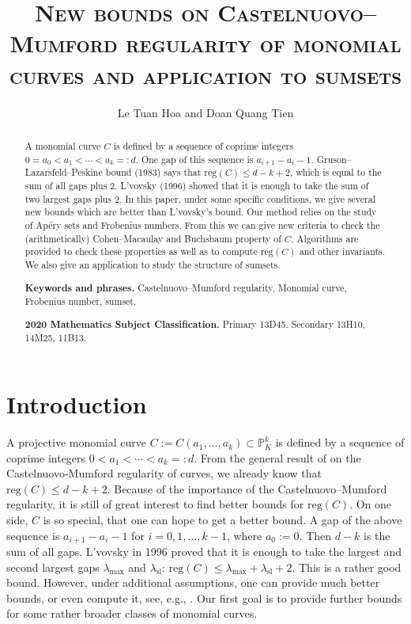 \documentclass[11pt]{article}
\date{}
\newcommand{\keywords}[1]{\par\smallskip\noindent\textbf{Keywords and phrases. }#1\par\smallskip}
\newcommand{\subjclass}[1]{\par\smallskip\noindent\textbf{2020 Mathematics Subject Classification. }#1\par\smallskip}
\def\reg{\mathrm{reg}}
\def\Pset{{\mathbb P}}
\theoremstyle{remark}
\theoremstyle{definition}
\begin{document}
\title{\textsc{New bounds on Castelnuovo--Mumford regularity of monomial curves and application to sumsets}}
\author{Le Tuan Hoa and Doan Quang Tien}

\maketitle
\begin{abstract}  
A monomial curve $C$ is defined by a sequence of coprime integers $0 = a_0 < a_1 < \cdots < a_k =: d$. One gap of this sequence is $a_{i+1} - a_i  - 1$. Gruson--Lazarsfeld--Peskine bound (1983) says that $\reg(C) \le d  -  k +2$, which is equal to the sum of all gaps plus 2. L'vovsky (1996) showed that it is enough  to take the sum of two largest gaps plus 2. In this paper, under some specific conditions, we give several new bounds which are better than L'vovsky’s bound.  Our method relies on the study of Ap\'ery sets  and Frobenius numbers. From this we can give new criteria to check the (arithmetically) Cohen--Macaulay and Buchsbaum property of $C$. Algorithms are provided to check these properties as well as to compute $\reg(C)$ and other invariants. We also give an application to study the structure of sumsets.
\keywords{Castelnuovo--Mumford regularity, Monomial curve, Frobenius number, sumset.}
\subjclass{Primary 13D45. Secondary 13H10, 14M25, 11B13.}
\end{abstract}


\section{Introduction}\label{Intr}
A projective monomial curve $C := C(a_1,\ldots,a_k) \subset \Pset_K^k$ is defined by  a sequence of coprime integers $0 < a_1 < \cdots < a_k =: d$. From the general result of \cite{GLP} on the Castelnuovo-Mumford regularity of curves, we already know that $\reg(C) \leq d-k+2$. Because of the importance of the Castelnuovo--Mumford regularity,  it is still of great interest to find  better bounds for  $\reg(C)$. On one side, $C$ is so special, that one can hope to get a better bound.  A gap of the above sequence is $a_{i+1} -  a_i  - 1$ for $i=0,1,\ldots, k-1$, where $a_0:= 0$. Then $d-k$ is the sum of all gaps.  L'vovsky \cite{Lv} in 1996 proved that it is enough to take the largest and second largest gaps  $\lambda_{\max}$ and $\lambda_{\mathrm{sl}}$: $\reg(C) \leq \lambda_{\max} + \lambda_{\mathrm{sl}} + 2$. This is a rather good bound. However, under additional assumptions, one can provide much better bounds, or even compute it, see,  e.g., \cite{BCFH, HeHS, LT}. Our first goal is to provide further bounds for some rather broader classes of monomial curves.
\end{document}
